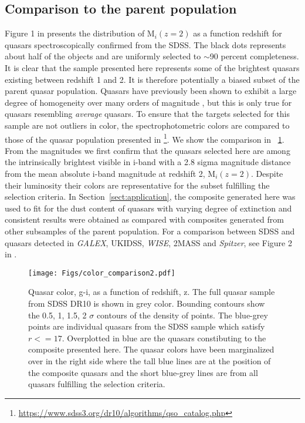 \documentclass{aa}    %
\newcommand{\figref}[1]{\ref{fig:#1}}
\newcommand{\Fig}[1]{\figurename~\figref{#1}}
\newcommand{\fig}[1]{\Fig{#1}}
\newcommand{\figlabel}[1]{\label{fig:#1}}
\newcommand{\sectionname}{Section}
\newcommand{\Sect}[1]{\sectionname~\ref{sect:#1}}
\newcommand{\sect}[1]{\Sect{#1}}
\newcommand{\sectlabel}[1]{\label{sect:#1}}
\begin{document}
\subsection{Comparison to the parent population}  \sectlabel{parents}

Figure 1 in \cite{Shen2011} presents the distribution of M$_i(z=2)$ as a function redshift for quasars spectroscopically confirmed from the SDSS. The black dots represents about half of the objects and are uniformly selected to $\sim$90 percent completeness\citep{Richards2002, VandenBerk2005}. It is clear that the sample presented here represents some of the brightest quasars existing between redshift 1 and 2. It is therefore potentially a biased subset of the parent quasar population. Quasars have previously been shown to exhibit a large degree of homogeneity over many orders of magnitude \citep{Dietrich2002}, but this is only true for quasars resembling \textit{average} quasars. To ensure that the targets selected for this sample are not outliers in color, the spectrophotometric colors are compared to those of the quasar population presented in \citet{Paris2014}\footnote{\url{https://www.sdss3.org/dr10/algorithms/qso_catalog.php}}. We show the comparison in \fig{color_comparison}. From the magnitudes we first confirm that the quasars selected here are among the intrinsically brightest visible in i-band with a 2.8 sigma magnitude distance from the mean absolute i-band magnitude at redshift 2, M$_i(z=2)$. Despite their luminosity their colors are representative for the subset fulfilling the selection criteria. In \sect{application}, the composite generated here was used to fit for the dust content of quasars with varying degree of extinction and consistent results were obtained as compared with composites generated from other subsamples of the parent population. For a comparison between SDSS and quasars detected in \textit{GALEX}, UKIDSS, \textit{WISE}, 2MASS and \textit{Spitzer}, see Figure 2 in \cite{Krawczyk2013}.


 \begin{figure}[t!]
   \centering
   \texttt{[image: Figs/color\_comparison2.pdf]}
   \caption[]{Quasar color, g-i,  as a function of redshift, z. The full quasar sample from SDSS DR10 \citep{Paris2014} is shown in grey color. Bounding contours show the 0.5, 1, 1.5, 2 $\sigma$ contours of the density of points. The blue-grey points are individual quasars from the SDSS sample which satisfy $r <= 17$. Overplotted in blue are the quasars constibuting to the composite presented here. The quasar colors have been marginalized over in the right side where the tall blue lines are at the position of the composite quasars and the short blue-grey lines are from all quasars fulfilling the selection criteria.}
  \figlabel{color_comparison}
 \end{figure}
\end{document}
